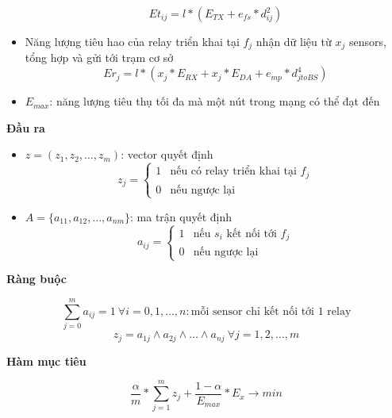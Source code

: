\begin{itemize}
    \begin{equation}
        Et_{ij} = l * (E_{TX} + e_{fs} * d_{ij}^2)
        \label{sensor_consumption}
    \end{equation}
    \item Năng lượng tiêu hao của relay triển khai tại $f_j$ nhận dữ liệu từ $x_j$ sensors, tổng hợp và gửi tới trạm cơ sở
    \begin{equation}
        Er_j = l * (x_j * E_{RX} + x_j * E_{DA} + e_{mp} * d_{jtoBS}^4)
        \label{relay_consumption}
    \end{equation}
    \item $E_{max}$: năng lượng tiêu thụ tối đa mà một nút trong mạng có thể đạt đến
\end{itemize}
\textbf{Đầu ra }
\begin{itemize}
    \item $z = (z_1, z_2,…, z_m)$: vector quyết định
    \begin{equation}
        z_j = \begin{cases}
            1 & \textrm{nếu có relay triển khai tại $f_j$}\\
            0 & \textrm{nếu ngược lại}
        \end{cases}
    \end{equation}
    \item $A = \{a_{11}, a_{12},…, a_{nm}\}$: ma trận quyết định
    \begin{equation}
        a_{ij} = \begin{cases}
            1 & \textrm{nếu $s_i$ kết nối tới $f_j$}\\
            0 & \textrm{nếu ngược lại}
        \end{cases}
    \end{equation}
\end{itemize}
\textbf{Ràng buộc }

\begin{equation}
    \sum_{j = 0}^m a_{ij} = 1 ~\forall i = 0, 1, \ldots, n: \textrm{mỗi sensor chỉ kết nối tới 1 relay}
\end{equation}
\begin{equation}
    z_j = a_{1j} \wedge a_{2j} \wedge \ldots \wedge a_{nj} ~\forall j = 1, 2, \ldots, m
\end{equation}

\textbf{Hàm mục tiêu }

\begin{equation}
    \frac{\alpha}{m} * \sum_{j = 1}^m z_j + \frac{1 - \alpha}{E_{max}} * E_x \rightarrow min
    \label{obj_func}
\end{equation}

